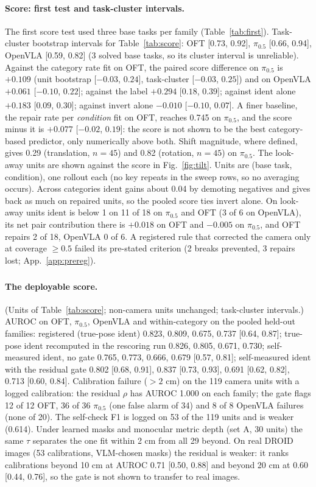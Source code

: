 \documentclass{article}
\newcommand{\ident}{\mathrm{ident}}
\newcommand{\invert}{\mathrm{invert}}
\newcommand{\pihalf}{$\pi_{0.5}$}
\newcommand{\ph}{\textsuperscript{\dag}}
\begin{document}
\paragraph{Score: first test and task-cluster intervals.} The first score test used three base tasks per family
(Table~\ref{tab:first}). Task-cluster bootstrap intervals for Table~\ref{tab:score}: OFT [0.73, 0.92], \pihalf{} [0.66,
0.94], OpenVLA [0.59, 0.82] (3 solved base tasks, so its cluster interval is unreliable). Against the category rate fit
on OFT, the paired score difference on \pihalf{} is $+0.109$ (unit bootstrap [$-0.03$, $0.24$], task-cluster [$-0.03$,
$0.25$]) and on OpenVLA $+0.061$ [$-0.10$, $0.22$]; against the label $+0.294$ [$0.18$, $0.39$]; against $\ident$ alone
$+0.183$ [$0.09$, $0.30$]; against $\invert$ alone $-0.010$ [$-0.10$, $0.07$]. A finer baseline\ph, the repair rate per
\emph{condition} fit on OFT, reaches 0.745 on \pihalf, and the score minus it is $+0.077$ [$-0.02$, $0.19$]: the score is
not shown to be the best category-based predictor, only numerically above both. Shift magnitude, where defined, gives
0.29 (translation, $n=45$) and 0.82 (rotation, $n=45$) on \pihalf. The look-away units are shown against the score in
Fig.~\ref{fig:tilt}. Units are (base task, condition), one rollout each (no key
repeats in the sweep rows, so no averaging occurs). Across categories $\ident$ gains about 0.04 by demoting negatives
and gives back as much on repaired units, so the pooled score ties $\invert$ alone. On look-away units $\ident$ is below
1 on 11 of 18 on \pihalf{} and OFT (3 of 6 on OpenVLA), its net pair contribution there is $+0.018$ on OFT and
$-0.005$ on \pihalf, and OFT repairs 2 of 18, OpenVLA 0 of 6. A registered rule that corrected the camera only at
coverage $\ge 0.5$ failed its pre-stated criterion (2 breaks prevented, 3 repairs lost; App.~\ref{app:prereg}).

\paragraph{The deployable score\ph.} (Units of
Table~\ref{tab:score}; non-camera units unchanged; task-cluster intervals.) AUROC on OFT, \pihalf, OpenVLA and
within-category on the pooled held-out families:
registered (true-pose $\ident$) 0.823, 0.809, 0.675, 0.737 [0.64, 0.87];
true-pose $\ident$ recomputed in the rescoring run 0.826, 0.805, 0.671, 0.730;
self-measured $\ident$, no gate 0.765, 0.773, 0.666, 0.679 [0.57, 0.81];
self-measured $\ident$ with the residual gate 0.802 [0.68, 0.91], 0.837 [0.73, 0.93], 0.691 [0.62, 0.82], 0.713 [0.60,
0.84]. Calibration failure ($> 2$ cm) on the 119 camera units with a logged calibration: the residual $\rho$ has AUROC
1.000 on each family; the gate flags 12 of 12 OFT, 36 of 36 \pihalf{} (one false alarm of 34) and 8 of 8 OpenVLA
failures (none of 20). The self-check F1 is logged on 53 of the 119 units and is weaker (0.614). Under learned masks
and monocular metric depth (set A, 30 units) the same $\tau$ separates the one fit within 2 cm from all 29 beyond. On
real DROID images (53 calibrations, VLM-chosen masks) the residual is weaker: it ranks
calibrations beyond 10 cm at AUROC 0.71 [0.50, 0.88] and beyond 20 cm at 0.60 [0.44, 0.76], so the gate is not shown to
transfer to real images.
\end{document}
